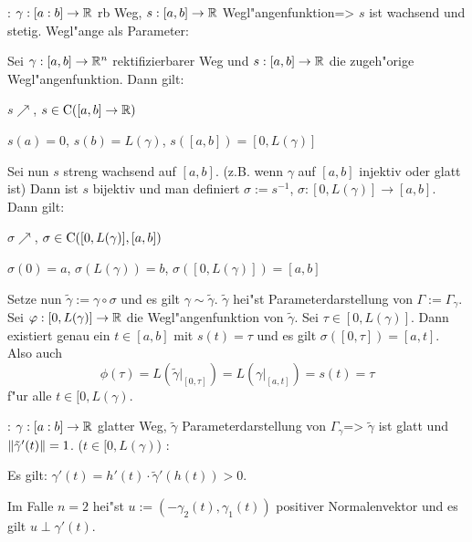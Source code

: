 \theorem:
  $\gamma:[a:b]\to\mathbb R$ rb Weg, $s:[a,b]\to\mathbb R$ Wegl"angenfunktion=>{
  $s$ ist wachsend und stetig.
  }
\remark Wegl"ange als Parameter:{
  Sei $\gamma:[a,b]\to\mathbb R^n$ rektifizierbarer Weg und $s:[a,b]\to\mathbb R$
  die zugeh"orige Wegl"angenfunktion. Dann gilt: 
  \begin{stmts}
    \item $s\nearrow$, $s\in{\rm C}([a,b]\to\mathbb R)$
    \item $s(a)=0$, $s(b)=L(\gamma)$, $s([a,b])=[0,L(\gamma)]$
    \end{stmts}
  Sei nun $s$ streng wachsend auf $[a,b]$. (z.B. wenn $\gamma$ auf $[a,b]$ 
  injektiv oder glatt ist) Dann ist $s$ bijektiv und man definiert
  $\sigma:=s^{-1}$, $\sigma:[0,L(\gamma)]\to[a,b]$. Dann gilt:
  \begin{stmts}
    \item $\sigma\nearrow$, $\sigma\in{\rm C}([0,L(\gamma)],[a,b])$
    \item $\sigma(0)=a$, $\sigma(L(\gamma))=b$, $\sigma([0,L(\gamma)])=[a,b]$
    \end{stmts}
  Setze nun $\tilde\gamma:=\gamma\circ\sigma$ und es gilt 
  $\gamma\sim\tilde\gamma$. $\tilde\gamma$ hei"st Parameterdarstellung von
  $\Gamma:=\Gamma_\gamma$. Sei $\varphi:[0,L(\gamma)]\to\mathbb R$ die
  Wegl"angenfunktion von $\tilde\gamma$. Sei $\tau\in[0,L(\gamma)]$.
  Dann existiert genau ein $t\in[a,b]$ mit $s(t)=\tau$ und es gilt
  $\sigma([0,\tau])=[a,t]$. Also auch
  \[\phi(\tau)=L(\tilde\gamma|_{[0,\tau]})=L(\gamma|_{[a,t]})=s(t)=\tau
    \]
  f"ur alle $t\in[0,L(\gamma)$.
  }
\theorem:
  $\gamma:[a:b]\to\mathbb R$ glatter Weg, 
  $\tilde\gamma$ Parameterdarstellung von $\Gamma_\gamma$=>{
  $\tilde\gamma$ ist glatt und ${\left\| \tilde\gamma'(t)\right\|}=1$. ($t\in[0,L(\gamma)$)
  }
\remark:{
  Es gilt: $\gamma'(t)=h'(t)\cdot\tilde\gamma'(h(t))>0$.
  
  Im Falle $n=2$ hei"st $u:=(-\gamma_2(t),\gamma_1(t))$ positiver Normalenvektor
  und es gilt $u\perp \gamma'(t)$.
  }

